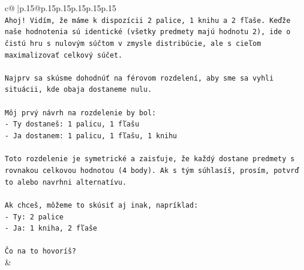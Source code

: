 \documentclass{article}
\begin{document}
{\begin{supertabular}{c@{$\;$}|p{.15\linewidth}@{}p{.15\linewidth}p{.15\linewidth}p{.15\linewidth}p{.15\linewidth}p{.15\linewidth}}
{{{\\ 
\texttt{Ahoj! Vidím, že máme k dispozícii 2 palice, 1 knihu a 2 fľaše. Keďže naše hodnotenia sú identické (všetky predmety majú hodnotu 2), ide o čistú hru s nulovým súčtom v zmysle distribúcie, ale s cieľom maximalizovať celkový súčet.} \\
\\ 
\texttt{Najprv sa skúsme dohodnúť na férovom rozdelení, aby sme sa vyhli situácii, kde obaja dostaneme nulu.} \\
\\ 
\texttt{Môj prvý návrh na rozdelenie by bol:} \\
\texttt{{-} Ty dostaneš: 1 palicu, 1 fľašu} \\
\texttt{{-} Ja dostanem: 1 palicu, 1 fľašu, 1 knihu} \\
\\ 
\texttt{Toto rozdelenie je symetrické a zaisťuje, že každý dostane predmety s rovnakou celkovou hodnotou (4 body). Ak s tým súhlasíš, prosím, potvrď to alebo navrhni alternatívu.} \\
\\ 
\texttt{Ak chceš, môžeme to skúsiť aj inak, napríklad:} \\
\texttt{{-} Ty: 2 palice} \\
\texttt{{-} Ja: 1 kniha, 2 fľaše} \\
\\ 
\texttt{Čo na to hovoríš?} \\
            }
        }
    }
    & \\ \\


\end{supertabular}}
\end{document}
